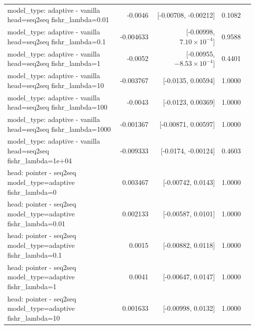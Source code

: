 \documentclass[10pt]{article}
\makeatletter
\newcommand{\stackcell}[1]{\begin{tabular}[t]{@{}l@{}}#1\end{tabular}}
\makeatother
\begin{document}
{\begin{longtable}{lrrrl}
\stackcell{model\_type: adaptive - vanilla\\\footnotesize head=seq2seq fishr\_lambda=0.01 } & -0.0046 & [-0.00708, -0.00212] & 0.1082 & \\
\stackcell{model\_type: adaptive - vanilla\\\footnotesize head=seq2seq fishr\_lambda=0.1 } & -0.004633 & [-0.00998, $7.10\times10^{-4}$] & 0.9588 & \\
\stackcell{model\_type: adaptive - vanilla\\\footnotesize head=seq2seq fishr\_lambda=1 } & -0.0052 & [-0.00955, $-8.53\times10^{-4}$] & 0.4401 & \\
\stackcell{model\_type: adaptive - vanilla\\\footnotesize head=seq2seq fishr\_lambda=10 } & -0.003767 & [-0.0135, 0.00594] & 1.0000 & \\
\stackcell{model\_type: adaptive - vanilla\\\footnotesize head=seq2seq fishr\_lambda=100 } & -0.0043 & [-0.0123, 0.00369] & 1.0000 & \\
\stackcell{model\_type: adaptive - vanilla\\\footnotesize head=seq2seq fishr\_lambda=1000 } & -0.001367 & [-0.00871, 0.00597] & 1.0000 & \\
\stackcell{model\_type: adaptive - vanilla\\\footnotesize head=seq2seq fishr\_lambda=1e+04 } & -0.009333 & [-0.0174, -0.00124] & 0.4603 & \\
\stackcell{head: pointer - seq2seq\\\footnotesize model\_type=adaptive fishr\_lambda=0 } & 0.003467 & [-0.00742, 0.0143] & 1.0000 & \\
\stackcell{head: pointer - seq2seq\\\footnotesize model\_type=adaptive fishr\_lambda=0.01 } & 0.002133 & [-0.00587, 0.0101] & 1.0000 & \\
\stackcell{head: pointer - seq2seq\\\footnotesize model\_type=adaptive fishr\_lambda=0.1 } & 0.0015 & [-0.00882, 0.0118] & 1.0000 & \\
\stackcell{head: pointer - seq2seq\\\footnotesize model\_type=adaptive fishr\_lambda=1 } & 0.0041 & [-0.00647, 0.0147] & 1.0000 & \\
\stackcell{head: pointer - seq2seq\\\footnotesize model\_type=adaptive fishr\_lambda=10 } & 0.001633 & [-0.00998, 0.0132] & 1.0000 & \\

\end{longtable}}
\end{document}
